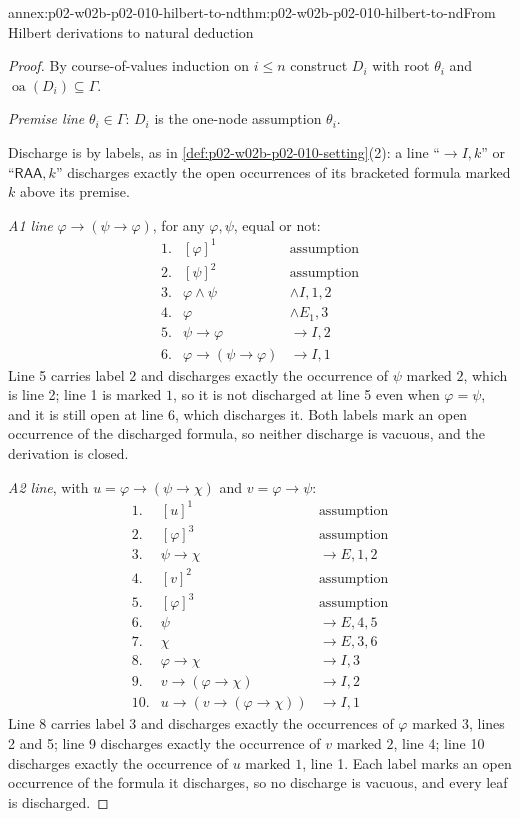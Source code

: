 \begin{annexitem}{annex:p02-w02b-p02-010-hilbert-to-nd}{thm:p02-w02b-p02-010-hilbert-to-nd}{From Hilbert derivations to natural deduction}
\begin{proof}
By course-of-values induction on \(i\le n\) construct \(D_i\) with root
\(\theta_i\) and \(\operatorname{oa}(D_i)\subseteq\Gamma\).

\emph{Premise line} \(\theta_i\in\Gamma\): \(D_i\) is the one-node
assumption \(\theta_i\).

Discharge is by labels, as in \cref{def:p02-w02b-p02-010-setting}(2): a
line ``\(\to I,k\)'' or ``\(\mathsf{RAA},k\)'' discharges exactly the open
occurrences of its bracketed formula marked \(k\) above its premise.

\emph{A1 line} \(\varphi\to(\psi\to\varphi)\), for any
\(\varphi,\psi\), equal or not:
\[
\begin{array}{rll}
1.&[\varphi]^1&\text{assumption}\\
2.&[\psi]^2&\text{assumption}\\
3.&\varphi\land\psi&\land I,1,2\\
4.&\varphi&\land E_1,3\\
5.&\psi\to\varphi&\to I,2\\
6.&\varphi\to(\psi\to\varphi)&\to I,1
\end{array}
\]
Line 5 carries label \(2\) and discharges exactly the occurrence of
\(\psi\) marked \(2\), which is line 2; line 1 is marked \(1\), so it is not
discharged at line 5 even when \(\varphi=\psi\), and it is still open at
line 6, which discharges it.  Both labels mark an open occurrence of the
discharged formula, so neither discharge is vacuous, and the derivation is
closed.

\emph{A2 line}, with \(u=\varphi\to(\psi\to\chi)\) and
\(v=\varphi\to\psi\):
\[
\begin{array}{rll}
1.&[u]^1&\text{assumption}\\
2.&[\varphi]^3&\text{assumption}\\
3.&\psi\to\chi&\to E,1,2\\
4.&[v]^2&\text{assumption}\\
5.&[\varphi]^3&\text{assumption}\\
6.&\psi&\to E,4,5\\
7.&\chi&\to E,3,6\\
8.&\varphi\to\chi&\to I,3\\
9.&v\to(\varphi\to\chi)&\to I,2\\
10.&u\to(v\to(\varphi\to\chi))&\to I,1
\end{array}
\]
Line 8 carries label \(3\) and discharges exactly the occurrences of
\(\varphi\) marked \(3\), lines 2 and 5; line 9 discharges exactly the
occurrence of \(v\) marked \(2\), line 4; line 10 discharges exactly the
occurrence of \(u\) marked \(1\), line 1.  Each label marks an open
occurrence of the formula it discharges, so no discharge is vacuous, and
every leaf is discharged.


\end{proof}
\end{annexitem}
